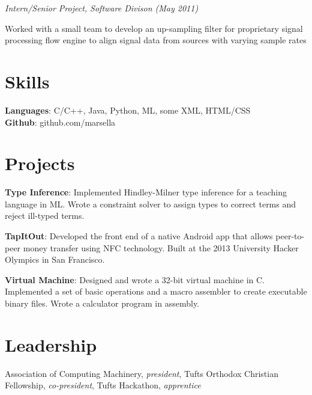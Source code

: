 \documentclass{article}
\newcommand{\position}[2]{
  \textit{#1 (#2)}
}
\newenvironment{achievements}{
  \begin{compactitem} }{
  \end{compactitem}
}
\newcommand{\skill}[2]{
  \textbf{#1}: #2
}
\begin{document}
    \position {Intern/Senior Project, Software Divison} {May 2011}
    \begin{achievements}
      \item Worked with a small team to develop an up-sampling filter for
      proprietary signal processing flow engine to align signal data from sources
      with varying sample rates
    \end{achievements}

\section*{Skills}
  \skill{Languages} {C/C++, Java, Python, ML, some XML, HTML/CSS} \\
  \skill{Github}    {github.com/marsella}

\section*{Projects}
  \skill{Type Inference}
        {Implemented Hindley-Milner type inference for a teaching language in
        ML. Wrote a constraint solver to assign types to correct terms and
        reject ill-typed terms.} 
        \smallskip
        
  \skill{TapItOut}
        {Developed the front end of a native Android app that allows
        peer-to-peer money transfer using NFC technology. Built at the 2013
        University Hacker Olympics in San Francisco.}
        \smallskip

  \skill{Virtual Machine}
        {Designed and wrote a 32-bit virtual machine in C. Implemented a set of
        basic operations and a macro assembler to create executable binary
        files. Wrote a calculator program in assembly.}

\section*{Leadership}
  Association of Computing Machinery, \textit{president}, Tufts Orthodox
  Christian Fellowship, \textit{co-president}, Tufts Hackathon,
  \textit{apprentice}
\end{document}
